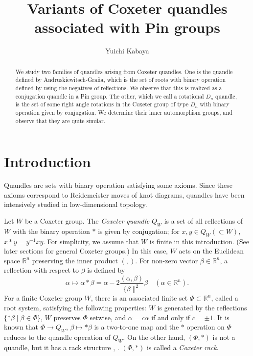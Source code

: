 \documentclass{amsart}
\title{Variants of Coxeter quandles associated with Pin groups}
\author{Yuichi Kabaya}
\theoremstyle{definition}
\theoremstyle{remark}
\numberwithin{equation}{section}
\begin{document}
\maketitle

\begin{abstract}
We study two families of quandles arising from Coxeter quandles.
One is the quandle defined by Andruskiewitsch-Gra\~{n}a, 
which is the set of roots with binary operation
defined by using the negatives of reflections.
We observe that this is realized as a conjugation quandle in a Pin group.
The other, which we call a rotational $D_n$ quandle, 
is the set of some right angle rotations in the Coxeter group of type $D_n$
with binary operation given by conjugation.
We determine their inner automorphism groups, and observe that they are quite similar. 
\end{abstract}


\section{Introduction}
Quandles are sets with binary operation satisfying some axioms.
Since these axioms correspond to Reidemeister moves of knot diagrams, 
quandles have been intensively studied in low-dimensional topology.

Let $W$ be a Coxeter group.
The \emph{Coxeter quandle} $Q_W$ is a set of all reflections of $W$ 
with the binary operation $*$ is given by conjugation; 
for $x, y \in Q_W (\subset W)$, $x*y = y^{-1} x y$.
For simplicity, we assume that $W$ is finite in this introduction. 
(See later sections for general Coxeter groups.) 
In this case, $W$ acts on the Euclidean space $\mathbb{R}^n$ preserving 
the inner product $(,)$.
For non-zero vector $\beta \in \mathbb{R}^n$, 
a reflection with respect to $\beta$ is defined by 
\[
\alpha \mapsto \alpha * \beta = \alpha - 2 \frac{(\alpha, \beta)}{\{ \beta \|^2} \beta
\quad (\alpha \in \mathbb{R}^n).
\]
For a finite Coxeter group $W$, 
there is an associated finite set $\Phi \subset \mathbb{R}^n$, called a root system, 
satisfying the following properties:
$W$ is generated by the reflections $\{ * \beta \mid \beta \in \Phi \}$, 
$W$ preserves $\Phi$ setwise, and $\alpha = c \alpha$ if and only if $c = \pm 1$.
It is known that $\Phi \to Q_W$, $\beta \mapsto *\beta $ is a two-to-one map
and the $*$ operation on $\Phi$ reduces to the quandle operation of $Q_W$.
On the other hand, $(\Phi, *)$ is not a quandle, but it has a rack structure 
\cite{AG}, \cite{Akita}. $(\Phi, *)$ is called a \emph{Coxeter rack}.
\end{document}
